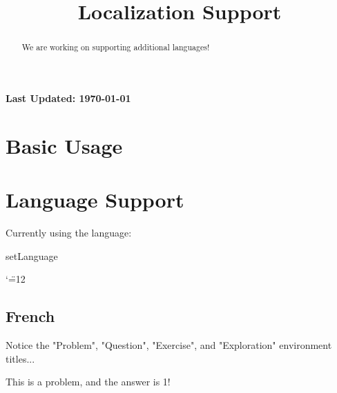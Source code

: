 \documentclass{ximera}
\title{Localization Support}
\begin{document}
\begin{abstract}%
    We are working on supporting additional languages!
\end{abstract}
\maketitle

{{\Huge \bfseries Last Updated: \today}} \\

\section{Basic Usage}


\section*{Language Support}%

\makeatletter
{}


Currently using the language:  %

\ifcsname setLanguage\endcsname \else \newcommand{\setLanguage}[1]{} \fi

\makeatother

\catcode`\"=12

    \subsection*{French}%
    
        Notice the "Problem", "Question", "Exercise", and "Exploration" environment titles... 
        \begin{problem}%
            This is a problem, and the answer is 1! %
            \begin{multipleChoice}
            \end{multipleChoice}%
        \end{problem}
            
\end{document}
